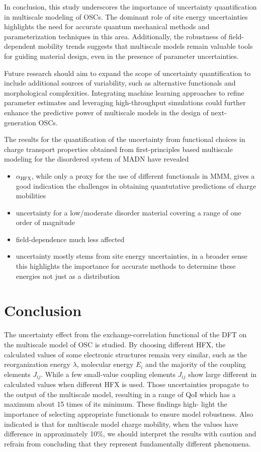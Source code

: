 \documentclass[%
 reprint,
superscriptaddress,
 amsmath,amssymb,
 aps,
prb,
floatfix
]{revtex4-2}
\newcommand{\ahfx}{\ensuremath{\alpha_\text{HFX}}\xspace}
\begin{document}
In conclusion, this study underscores the importance of uncertainty quantification in multiscale modeling of OSCs. The dominant role of site energy uncertainties highlights the need for accurate quantum mechanical methods and parameterization techniques in this area. Additionally, the robustness of field-dependent mobility trends suggests that multiscale models remain valuable tools for guiding material design, even in the presence of parameter uncertainties.  

Future research should aim to expand the scope of uncertainty quantification to include additional sources of variability, such as alternative functionals and morphological complexities. Integrating machine learning approaches to refine parameter estimates and leveraging high-throughput simulations could further enhance the predictive power of multiscale models in the design of next-generation OSCs.  



The results for the quantification of the uncertainty from functional choices in charge transport properties obtained from first-principles based multiscale modeling for the disordered system of MADN have revealed 

\begin{itemize}
\item \ahfx, while only a proxy for the use of different functionals in MMM, gives a good indication the challenges in obtaining quantutative predictions of charge mobilities
\item uncertainty for a low/moderate disorder material covering a range of one order of magnitude 
\item field-dependence much less affected
\item uncertainty mostly stems from site energy uncertainties, in a broader sense this highlights the importance for accurate methods to determine these energies not just as a distribution
\end{itemize}


\section{Conclusion}
The uncertainty effect from the exchange-correlation functional of the DFT on the multiscale model of OSC is studied. By choosing different HFX, the calculated values of some electronic structures remain very similar,
such as the reorganization energy $\lambda$, molecular energy $E_i$ and the majority of the coupling elements  $J_{ij}$. While a few small-value coupling elements $J_{ij}$ show large different in calculated values when different HFX is used. Those uncertainties propagate to the output of the multiscale model, resulting in a range of QoI which has a maximum about 15 times of its minimum. These findings high-
light the importance of selecting appropriate functionals to ensure model robustness. Also indicated is that for multiscale model charge mobility, when the values have difference in approximately 10\%, we should interpret the results with caution and refrain from concluding that they represent fundamentally different phenomena.
\end{document}
